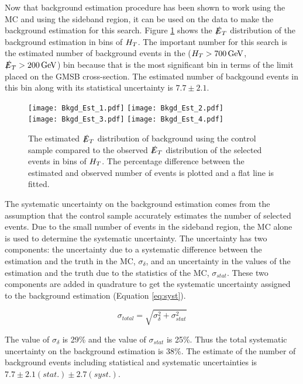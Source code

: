 Now that background estimation procedure has been shown to work using the MC and
using the sideband region, it can be used on the data to make the background
estimation for this search. Figure \ref{fig:Bkgd_Est} shows the $\slashed{E}_{T}$
distribution of the background estimation in bins of $H_{T}$. The important number 
for this search is the estimated number of background events in the 
($H_{T}>700\, \mathrm{GeV}$, $\slashed{E}_{T}>200\, \mathrm{GeV}$) bin because that is the most 
significant bin in terms of the limit placed on the GMSB cross-section. The 
estimated number of backgound events in this bin along with its statistical 
uncertainty is $7.7\pm2.1$. \\

\begin{figure}
\texttt{[image: Bkgd\_Est\_1.pdf]}
\texttt{[image: Bkgd\_Est\_2.pdf]}\\
\texttt{[image: Bkgd\_Est\_3.pdf]}
\texttt{[image: Bkgd\_Est\_4.pdf]}\\
\caption{The estimated $\slashed{E}_{T}$ distribution of background using the control
sample compared to the observed $\slashed{E}_{T}$ distribution of the selected events in 
bins of $H_{T}$. The percentage difference between the estimated and observed
number of events is plotted and a flat line is fitted.}
\label{fig:Bkgd_Est}
\end{figure}

The systematic uncertainty on the background estimation comes from the assumption 
that the control sample accurately estimates the number of selected events. Due
to the small number of events in the sideband region, the MC alone is used to
determine the systematic uncertainty. The uncertainty has two components: the
uncertainty due to a systematic difference between the estimation and the truth 
in the MC, $\sigma_{\delta}$, and an uncertainty in the values of the estimation 
and the truth due to the statistics of the MC, $\sigma_{stat}$. These two 
components are added in quadrature to get the systematic uncertainty assigned to 
the background estimation (Equation \ref{eq:syst}).

\begin{equation}
\sigma_{total} = \sqrt{\sigma_{\delta}^{2} + \sigma_{stat}^{2}}
\label{eq:syst}
\end{equation}

The value of $\sigma_{\delta}$ is 29\unit{\%} and the value of $\sigma_{stat}$
is 25\unit{\%}. Thus the total systematic uncertainty on the background 
estimation is 38\unit{\%}. The estimate of the number of background events 
including statistical and systematic uncertainties is 
$7.7\pm2.1(stat.)\pm2.7(syst.)$.

